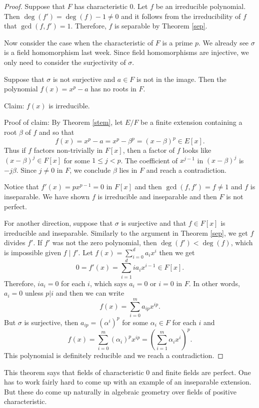 \documentclass[12pt]{report}
\theoremstyle{definition}
\def\aa{\alpha}
\def\bb{\beta}
\begin{document}
\begin{proof}
    Suppose that $F$ has characteristic 0. Let $f$ be an irreducible polynomial. Then $\deg(f')=\deg(f)-1\not=0$ and it follows from the irreducibility of $f$ that $\gcd(f,f')=1$. Therefore, $f$ is separable by Theorem \ref{sep}.  

    Now consider the case when the characteristic of $F$ is a prime $p$. We already see $\sigma$ is a field homomorphism last week. Since field homomorphisms are injective, we only need to consider the surjectivity  of $\sigma$.

    Suppose that $\sigma$ is not surjective and $a\in F$ is not in the image. Then the polynomial $f(x)=x^p-a$ has no roots in $F$. 
    
    Claim: $f(x)$ is irreducible.

    Proof of claim: By Theorem \ref{stem}, let $E/F$ be a finite extension containing a root $\bb$ of $f$ and so that $$f(x)=x^p-a=x^p-\bb^p=(x-\bb)^p \in E[x].$$
    Thus if $f$ factors non-trivially in $F[x]$, then a factor of $f$ looks like $(x-\bb)^j \in F[x]$ for some $1\leq j<p$. The coefficient of $x^{j-1}$ in $(x-\bb)^j$ is $-j\bb$. Since $j\not=0$ in $F$, we conclude $\bb$ lies in $F$ and reach a contradiction. 

    Notice that $f'(x)=px^{p-1} = 0$ in $F[x]$ and then $\gcd(f,f')=f\not=1$ and $f$ is inseparable. We have shown $f$ is irreducible and inseparable and then $F$ is not perfect.
    
    For another direction, suppose that $\sigma$ is surjective and that $f\in F[x]$ is irreducible and inseparable. Similarly to the argument in Theorem \ref{sep}, we get $f$ divides $f'$. If $f'$ was not the zero polynomial, then $\deg(f')< \deg(f)$, which is impossible given $f\mid f'$. Let $f(x)=\sum_{i=0}^d a_ix^i$ then we get $$0=f'(x)=\sum_{i=1}^dia_ix^{i-1}\in F[x].$$  Therefore, $ia_i=0$ for each $i$, which says $a_i=0$ or $i=0$ in $F$. In other words, $a_i=0$ unless $p|i$ and then we can write $$f(x)= \sum_{i=0}^m a_{ip}x^{ip}.$$ But $\sigma$ is surjective, then $a_{ip} =  (\aa^i)^p$ for some $\aa_i\in F$ for each $i$ and $$f(x) =  \sum_{i=0}^m (\aa_i)^p x^{ip} = (\sum_{i=1}^m \aa_ix^i)^p.$$ This polynomial is definitely reducible and we reach a contradiction.
\end{proof}

This theorem says that fields of characteristic 0 and finite fields are perfect. One has to work fairly hard to come up with an example of an inseparable extension. But these do come up naturally in algebraic geometry over fields of positive characteristic.
\end{document}
